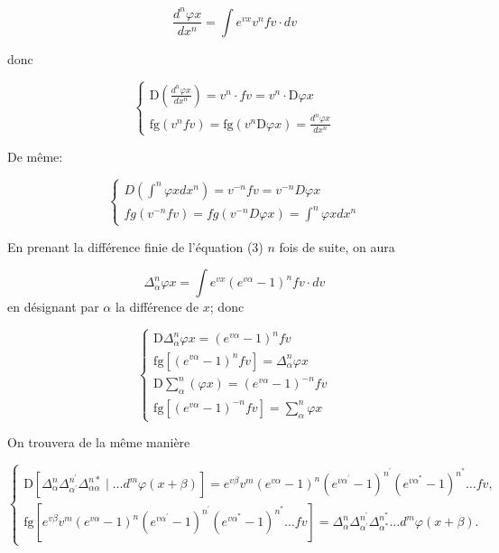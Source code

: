 \documentclass{article}
\begin{document}
\[
\frac{d^{n} \varphi x}{d x^{n}}=\int e^{v x} v^{n} f v \cdot d v
\]

donc

\[
\left\{\begin{array}{l}
\mathrm{D}\left(\frac{d^{n} \varphi x}{d x^{n}}\right)=v^{n} \cdot f v=v^{n} \cdot \mathrm{D} \varphi x \\
\mathrm{fg}\left(v^{n} f v\right)=\mathrm{fg}\left(v^{n} \mathrm{D} \varphi x\right)=\frac{d^{n} \varphi x}{d x^{n}}
\end{array}\right.
\]

De même:

\[
\left\{\begin{array}{l}
D\left(\int^{n} \varphi x d x^{n}\right)=v^{-n} f v=v^{-n} D \varphi x \\
f g\left(v^{-n} f v\right)=f g\left(v^{-n} D \varphi x\right)=\int^{n} \varphi x d x^{n}
\end{array}\right.
\]

En prenant la différence finie de l'équation (3) \(n\) fois de suite, on aura

\[
\Delta_{\alpha}^{n} \varphi x=\int e^{v x}\left(e^{v \alpha}-1\right)^{n} f v \cdot d v
\]
en désignant par \(\alpha\) la différence de \(x\); donc

\[
\left\{\begin{array}{l}
\mathrm{D} \Delta_{\alpha}^{n} \varphi x=\left(e^{v \alpha}-1\right)^{n} f v \\
\mathrm{fg}\left[\left(e^{v \alpha}-1\right)^{n} f v\right]=\Delta_{\alpha}^{n} \varphi x \\
\mathrm{D} \sum_{\alpha}^{n}(\varphi x)=\left(e^{v \alpha}-1\right)^{-n} f v \\
\mathrm{fg}\left[\left(e^{v \alpha}-1\right)^{-n} f v\right]=\sum_{\alpha}^{n} \varphi x
\end{array}\right.
\]

On trouvera de la même manière

\[
\left\{\begin{array}{l}
\mathrm{D}\left[\Delta_{\alpha}^{n} \Delta_{\alpha^{\prime}}^{n^{\prime}} \Delta_{\alpha \alpha}^{n *} \mid \ldots d^{m} \varphi(x+\beta)\right]=e^{v \beta} v^{m}\left(e^{v \alpha}-1\right)^{n}\left(e^{v \alpha^{\prime}}-1\right)^{n^{\prime}}\left(e^{v \alpha^{*}}-1\right)^{n^{*}} \ldots f v, \\
\mathrm{fg}\left[e^{v \beta} v^{m}\left(e^{v \alpha}-1\right)^{n}\left(e^{v \alpha^{\prime}}-1\right)^{n^{\prime}}\left(e^{v \alpha^{*}}-1\right)^{n^{*}} \ldots f v\right]=\Delta_{\alpha}^{n} \Delta_{\alpha^{\prime}}^{n^{\prime}} \Delta_{\alpha^{*}}^{n^{*}} \ldots d^{m} \varphi(x+\beta) .
\end{array}\right.
\]
\end{document}
